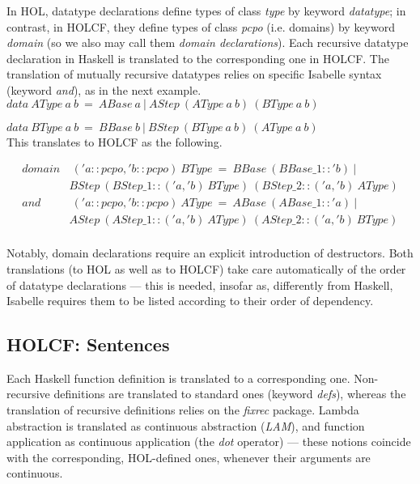 \documentclass{llncs}
\begin{document}
\noindent In HOL, datatype declarations define types of class
\emph{type} by keyword \emph{datatype}; in contrast, in HOLCF, they
define types of class \emph{pcpo} (i.e. domains) by keyword
\emph{domain} (so we also may call them \emph{domain declarations}).
Each recursive datatype declaration in Haskell is translated to the
corresponding one in HOLCF. The translation of mutually recursive
datatypes relies on specific Isabelle syntax (keyword
\emph{and}), as in the next example.\\

$data \ AType \ a \ b \ = \ ABase \ a \ | \ AStep \ (AType \ a \ b) \ (BType \ a \ b)  $

$data \ BType \ a \ b \ = \ BBase \ b \ | \ BStep \ (BType \ a \ b) \ (AType \ a \ b) $\\

\noindent This translates to HOLCF as the following.

$$\begin{array}{rr} domain & \ ('a::pcpo, 'b::pcpo) \ BType \ = \ BBase \ (BBase\_1::'b) \ | \\
   & BStep \ (BStep\_1::('a, 'b) \ BType) \ (BStep\_2::('a, 'b) \ AType) \\
   and & \ ('a::pcpo, 'b::pcpo) \ AType \ =  \ ABase \ (ABase\_1::'a) \ | \\
   & AStep \ (AStep\_1::('a, 'b) \ AType) \ (AStep\_2::('a, 'b) \ BType) \\
\end{array}$$

\noindent Notably, domain declarations require an explicit
introduction of destructors. Both translations (to HOL as well as to
HOLCF) take care automatically of the order of datatype declarations
--- this is needed, insofar as, differently from Haskell, Isabelle
requires them to be listed according to their order of dependency.



\subsection{HOLCF: Sentences}

Each Haskell function definition is translated to a corresponding one.
Non-recursive definitions are translated to standard ones (keyword
\emph{defs}), whereas the translation of recursive definitions relies
on the \emph{fixrec} package. Lambda abstraction is translated as
continuous abstraction (\emph{LAM}), and function application as
continuous application (the \emph{dot} operator) --- these notions
coincide with the corresponding, HOL-defined ones, whenever their
arguments are continuous.
\end{document}
